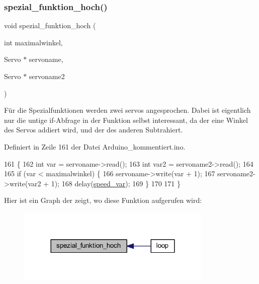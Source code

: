 \subsubsection{\texorpdfstring{spezial\+\_\+funktion\+\_\+hoch()}{spezial\_funktion\_hoch()}}
{\footnotesize\ttfamily void spezial\+\_\+funktion\+\_\+hoch (\begin{DoxyParamCaption}\item[{int}]{maximalwinkel,  }\item[{Servo $\ast$}]{servoname,  }\item[{Servo $\ast$}]{servoname2 }\end{DoxyParamCaption})}



Für die Spezialfunktionen werden zwei servos angesprochen. Dabei ist eigentlich nur die untige if-\/\+Abfrage in der Funktion selbst interessant, da der eine Winkel des Servos addiert wird, und der des anderen Subtrahiert. 



Definiert in Zeile 161 der Datei Arduino\+\_\+kommentiert.\+ino.


\begin{DoxyCode}
161                                                                                     \{
162   \textcolor{keywordtype}{int} var = servoname->read();
163   \textcolor{keywordtype}{int} var2 = servoname2->read();
164 
165   \textcolor{keywordflow}{if} (var < maximalwinkel) \{
166     servoname->write(var + 1);
167     servoname2->write(var2 + 1);
168     delay(\hyperlink{_arduino__kommentiert_8ino_a8b03f5396d8e845086daab48dcaca5cb}{speed\_var});
169   \}
170 
171 \}
\end{DoxyCode}
Hier ist ein Graph der zeigt, wo diese Funktion aufgerufen wird\+:\nopagebreak
\begin{figure}[H]
\begin{center}
\leavevmode
\includegraphics[width=264pt]{_arduino__kommentiert_8ino_ac03f54892f7473625ec7d6498ea5a010_icgraph}
\end{center}
\end{figure}
\mbox{\label{_arduino__kommentiert_8ino_abf7a5d6cd0eca7c0dacb61f5ef555beb}} 
